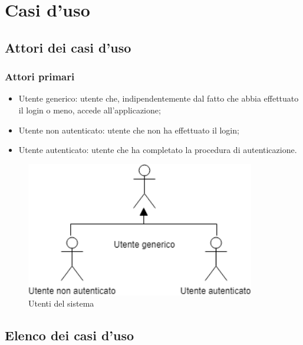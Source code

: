 \clearpage
\section{Casi d'uso}
\subsection{Attori dei casi d'uso}
\subsubsection{Attori primari}
\begin{itemize}
	\item  Utente generico: utente che, indipendentemente dal fatto che abbia effettuato il login o meno, accede all'applicazione;
	\item  Utente non autenticato: utente che non ha effettuato il login;
	\item  Utente autenticato: utente che ha completato la procedura di autenticazione.
\end{itemize}

\begin{figure}[H]
	\centering
	\includegraphics[width=10cm,keepaspectratio]{../includes/pics/primari.png}
	\caption{\label{fig:mission}Utenti del sistema}
\end{figure}

\subsection{Elenco dei casi d'uso}

